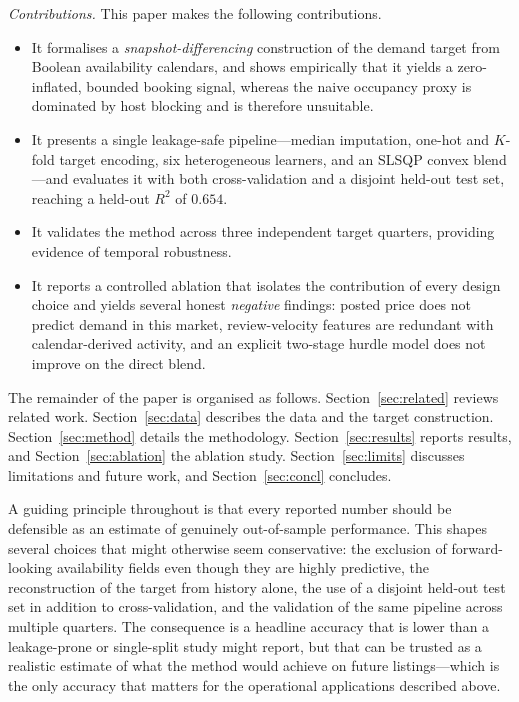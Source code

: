 \documentclass[journal]{IEEEtran}
\begin{document}
\emph{Contributions.} This paper makes the following contributions.
\begin{itemize}
\item It formalises a \emph{snapshot-differencing} construction of the demand
target from Boolean availability calendars, and shows empirically that it yields a
zero-inflated, bounded booking signal, whereas the naive occupancy proxy is
dominated by host blocking and is therefore unsuitable.
\item It presents a single leakage-safe pipeline---median imputation, one-hot and
$K$-fold target encoding, six heterogeneous learners, and an SLSQP convex
blend---and evaluates it with both cross-validation and a disjoint held-out test
set, reaching a held-out $R^2$ of $0.654$.
\item It validates the method across three independent target quarters, providing
evidence of temporal robustness.
\item It reports a controlled ablation that isolates the contribution of every
design choice and yields several honest \emph{negative} findings: posted price
does not predict demand in this market, review-velocity features are redundant
with calendar-derived activity, and an explicit two-stage hurdle model does not
improve on the direct blend.
\end{itemize}

The remainder of the paper is organised as follows.
Section~\ref{sec:related} reviews related work. Section~\ref{sec:data} describes
the data and the target construction. Section~\ref{sec:method} details the
methodology. Section~\ref{sec:results} reports results, and
Section~\ref{sec:ablation} the ablation study. Section~\ref{sec:limits} discusses
limitations and future work, and Section~\ref{sec:concl} concludes.

A guiding principle throughout is that every reported number should be defensible
as an estimate of genuinely out-of-sample performance. This shapes several choices
that might otherwise seem conservative: the exclusion of forward-looking
availability fields even though they are highly predictive, the reconstruction of
the target from history alone, the use of a disjoint held-out test set in addition
to cross-validation, and the validation of the same pipeline across multiple
quarters. The consequence is a headline accuracy that is lower than a leakage-prone
or single-split study might report, but that can be trusted as a realistic estimate
of what the method would achieve on future listings---which is the only accuracy
that matters for the operational applications described above.
\end{document}
